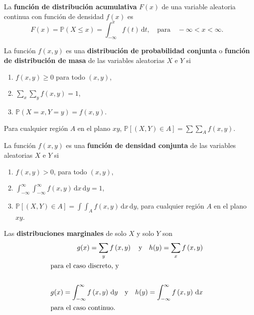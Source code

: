 \begin{definition}[]
La \textbf{función de distribución acumulativa} $F(x)$ de una variable aleatoria continua con función de densidad $f(x)$ es
\begin{equation*}
F(x)=\mathds{P}\left(X\le x\right)=\int_{-\infty}^{x}f(t)\,\mathrm{d}t,\quad\text{para}\quad-\infty<x<\infty.
\end{equation*}
\end{definition}

\begin{definition}[]
La función $f(x,y)$ es una \textbf{distribución de probabilidad conjunta} o \textbf{función de distribución de masa} de las variables aleatorias $X$ e $Y$ si
\begin{enumerate}
	\item $f(x,y)\ge 0$ para todo $\left(x,y\right)$,
	\item $\displaystyle\sum_{x}\sum_{y}f\left(x,y\right)=1$,
	\item $\mathds{P}\left(X=x, Y=y\right)=f\left(x,y\right)$.
\end{enumerate}
Para cualquier región $A$ en el plano $xy$, $\mathds{P}\left[\left(X,Y\right)\in A\right]=\displaystyle\sum\sum_{A}f\left(x,y\right)$.
\end{definition}

\begin{definition}[]
La función $f\left(x,y\right)$ es una \textbf{función de densidad conjunta} de las variables aleatorias $X$ e $Y$ si
\begin{enumerate}
	\item $f\left(x,y\right)>0$, para todo $\left(x,y\right)$,
	\item $\int_{-\infty}^{\infty}\int_{-\infty}^{\infty}f\left(x,y\right)\,\mathrm{d}x\,\mathrm{d}y=1$,
	\item $\mathds{P}\left[\left(X,Y\right)\in A\right]=\int\int_{A}f\left(x,y\right)\,\mathrm{d}x\,\mathrm{d}y$, para cualquier región $A$ en el plano $xy$.
\end{enumerate}
\end{definition}

\begin{definition}[]
Las \textbf{distribuciones marginales} de solo $X$ y solo $Y$ son
\begin{align*}
g(x)=\sum_{y}f\left(x,y\right)\quad\text{y}\quad h(y)=\sum_{x}f\left(x,y\right)\\
\intertext{para el caso discreto, y}\\
g(x)=\int_{-\infty}^{\infty}f\left(x,y\right)\,\mathrm{d}y\quad\text{y}\quad h(y)=\int_{-\infty}^{\infty}f\left(x,y\right)\,\mathrm{d}x\\
\intertext{para el caso continuo.}
\end{align*}
\end{definition}

